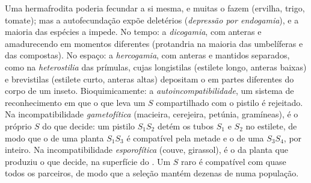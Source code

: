 \begin{proposition}\label{prop:b2:angiosperm-reproduction:selfing}
Uma  hermafrodita poderia fecundar a si mesma, e muitas o fazem
(ervilha, trigo, tomate); mas a autofecundação expõe  
deletérios (\emph{depressão por endogamia}), e a maioria das espécies a
impede. No tempo: a \emph{dicogamia}, com anteras e  amadurecendo
em momentos diferentes (protandria na maioria das umbelíferas e das
compostas). No espaço: a \emph{hercogamia}, com anteras e 
mantidos separados, como na \emph{heterostilia} das prímulas, cujas
 longistilas (estilete longo, anteras baixas) e brevistilas
(estilete curto, anteras altas) depositam o  em partes diferentes
do corpo de um inseto. Bioquimicamente: a \emph{autoincompatibilidade},
um sistema de reconhecimento em que o  que leva um  $S$
compartilhado com o pistilo é rejeitado. Na incompatibilidade
\emph{gametofítica} (macieira, cerejeira, petúnia, gramíneas), é o
próprio  $S$  do  que decide: um pistilo
$S_1S_2$ detém os tubos $S_1$ e $S_2$ no estilete, de modo que o 
de uma planta $S_1S_3$ é compatível pela metade e o de uma $S_3S_4$,
por inteiro. Na incompatibilidade \emph{esporofítica} (couve,
girassol), é o   da planta que produziu o  que
decide, na superfície do . Um  $S$ raro é compatível com
quase todos os parceiros, de modo que a seleção mantém dezenas de
 numa população.
\end{proposition}
